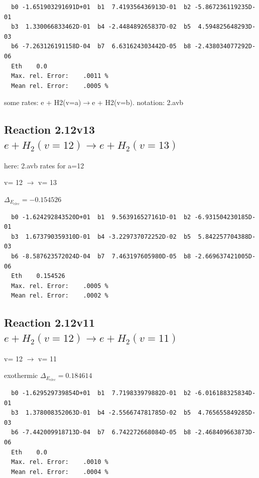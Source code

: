 \documentclass[12pt,dvipdfmx]{article}
\begin{document}
\begin{small}\begin{verbatim}
  b0 -1.651903291691D+01  b1  7.419356436913D-01  b2 -5.867236119235D-01
  b3  1.330066833462D-01  b4 -2.448489265837D-02  b5  4.594825648293D-03
  b6 -7.263126191158D-04  b7  6.631624303442D-05  b8 -2.438034077292D-06
  Eth    0.0
  Max. rel. Error:    .0011 %
  Mean rel. Error:    .0005 %

\end{verbatim}\end{small}

\newpage
some rates: e + H2(v=a)$\rightarrow$e + H2(v=b). notation: 2.avb


\subsection{
Reaction 2.12v13
$ e + H_2(v=12) \rightarrow e + H_2(v=13) $
}
here: 2.avb rates for a=12


  v=  12 $\rightarrow$ v= 13

$\Delta_{E_{elec}}=-0.154526$




\begin{small}\begin{verbatim}
  b0 -1.624292843520D+01  b1  9.563916527161D-01  b2 -6.931504230185D-01
  b3  1.673790359310D-01  b4 -3.229737072252D-02  b5  5.842257704388D-03
  b6 -8.587623572024D-04  b7  7.463197605980D-05  b8 -2.669637421005D-06
  Eth    0.154526
  Max. rel. Error:    .0005 %
  Mean rel. Error:    .0002 %

\end{verbatim}\end{small}


\subsection{
Reaction 2.12v11
$ e + H_2(v=12) \rightarrow e + H_2(v=11) $
}

  v=  12 $\rightarrow$ v= 11

exothermic $\Delta_{E_{elec}}= 0.184614$


\begin{small}\begin{verbatim}
  b0 -1.629529739854D+01  b1  7.719833979882D-01  b2 -6.016188325834D-01
  b3  1.378008352063D-01  b4 -2.556674781785D-02  b5  4.765655849285D-03
  b6 -7.442009918713D-04  b7  6.742272668084D-05  b8 -2.468409663873D-06
  Eth    0.0
  Max. rel. Error:    .0010 %
  Mean rel. Error:    .0004 %

\end{verbatim}\end{small}
\newpage
\end{document}
